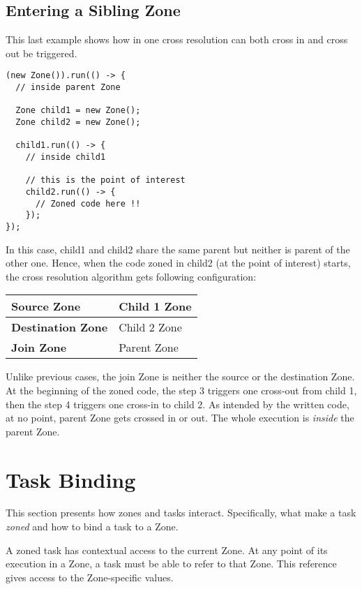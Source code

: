 \subsection*{Entering a Sibling Zone}

This last example shows how in one cross resolution can both cross in and cross out be triggered.

\begin{lstlisting}
(new Zone()).run(() -> {
  // inside parent Zone

  Zone child1 = new Zone();
  Zone child2 = new Zone();

  child1.run(() -> {
    // inside child1
    
    // this is the point of interest
    child2.run(() -> {
      // Zoned code here !!
    });
});
\end{lstlisting}

In this case, child1 and child2 share the same parent but neither is parent of the other one. Hence, when the code zoned in child2 (at the point of interest) starts, the cross resolution algorithm gets following configuration:

\begin{tabular}{| l | l |}
\hline
\textbf{Source Zone} & Child 1 Zone \\ \hline
\textbf{Destination Zone} & Child 2 Zone \\ \hline
\textbf{Join Zone} & Parent Zone \\ \hline
\end{tabular}

Unlike previous cases, the join Zone is neither the source or the destination Zone. At the beginning of the zoned code, the step 3 triggers one cross-out from child 1, then the step 4 triggers one cross-in to child 2. As intended by the written code, at no point, parent Zone gets crossed in or out. The whole execution is \emph{inside} the parent Zone.

\section{Task Binding}

This section presents how zones and tasks interact. Specifically, what make a task \emph{zoned} and how to bind a task to a Zone.

A zoned task has contextual access to the current Zone. At any point of its execution in a Zone, a task must be able to refer to that Zone. This reference gives
access to the Zone-specific values.

